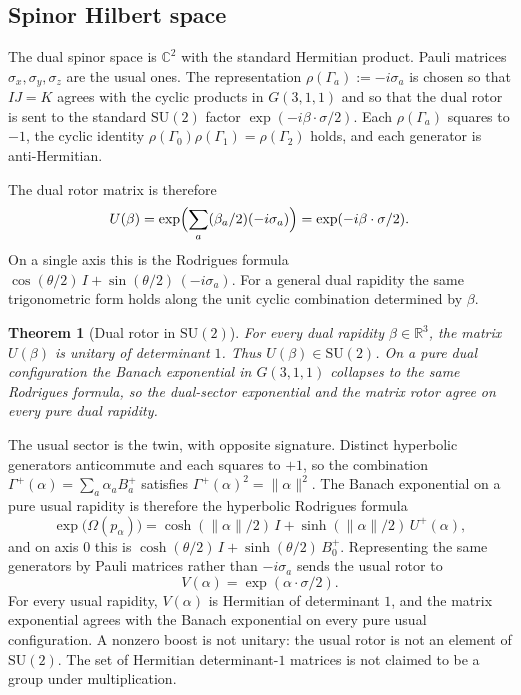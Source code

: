 \documentclass[a4paper]{article}
\newtheorem{theorem}{Theorem}[section]
\theoremstyle{definition}
\begin{document}
\subsection{Spinor Hilbert space}
\label{sec:spinor}

The dual spinor space is \(\mathbb{C}^2\) with the standard Hermitian
product. Pauli matrices \(\sigma_x,\sigma_y,\sigma_z\) are the usual
ones. The representation \(\rho(\Gamma_a):=-i\sigma_a\) is chosen so
that \(IJ=K\) agrees with the cyclic products in \(G(3,1,1)\) and so
that the dual rotor is sent to the standard \(\mathrm{SU}(2)\) factor
\(\exp(-i\beta\cdot\sigma/2)\). Each \(\rho(\Gamma_a)\) squares to
\(-1\), the cyclic identity
\(\rho(\Gamma_0)\rho(\Gamma_1)=\rho(\Gamma_2)\) holds, and each
generator is anti-Hermitian.

The dual rotor matrix is therefore
\[
U(\beta)
=\exp\Bigl(\sum_a(\beta_a/2)(-i\sigma_a)\Bigr)
=\exp(-i\beta\cdot\sigma/2).
\]
On a single axis this is the Rodrigues formula
\(\cos(\theta/2)\,I+\sin(\theta/2)\,(-i\sigma_a)\). For a general dual
rapidity the same trigonometric form holds along the unit cyclic
combination determined by \(\beta\).

\begin{theorem}[Dual rotor in \(\mathrm{SU}(2)\)]
\label{thm:su2}
For every dual rapidity \(\beta\in\mathbb{R}^3\), the matrix \(U(\beta)\)
is unitary of determinant \(1\). Thus \(U(\beta)\in\mathrm{SU}(2)\).
On a pure dual configuration the Banach exponential in \(G(3,1,1)\)
collapses to the same Rodrigues formula, so the dual-sector exponential
and the matrix rotor agree on every pure dual rapidity.
\end{theorem}

The usual sector is the twin, with opposite signature. Distinct
hyperbolic generators anticommute and each squares to \(+1\), so the
combination \(\Gamma^+(\alpha)=\sum_a\alpha_a B^+_a\) satisfies
\(\Gamma^+(\alpha)^2=\lVert\alpha\rVert^2\). The Banach exponential on a
pure usual rapidity is therefore the hyperbolic Rodrigues formula
\[
\exp\bigl(\Omega(p_\alpha)\bigr)
=\cosh(\lVert\alpha\rVert/2)\,I
+\sinh(\lVert\alpha\rVert/2)\,U^+(\alpha),
\]
and on axis \(0\) this is
\(\cosh(\theta/2)\,I+\sinh(\theta/2)\,B^+_0\). Representing the same
generators by Pauli matrices rather than \(-i\sigma_a\) sends the usual
rotor to
\[
V(\alpha)=\exp(\alpha\cdot\sigma/2).
\]
For every usual rapidity, \(V(\alpha)\) is Hermitian of determinant
\(1\), and the matrix exponential agrees with the Banach exponential on
every pure usual configuration. A nonzero boost is not unitary: the
usual rotor is not an element of \(\mathrm{SU}(2)\). The set of
Hermitian determinant-\(1\) matrices is not claimed to be a group under
multiplication.
\end{document}
